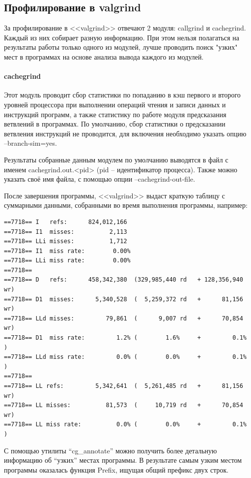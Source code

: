 \documentclass[12pt]{article}
\begin{document}
\subsection*{Профилирование в valgrind}

За профилирование в <<valgrind>> отвечают 2 модуля: callgrind и cachegrind. Каждый из них собирает разную информацию. При этом нельзя полагаться на результаты работы только одного из модулей, лучше проводить поиск "узких" мест в программах на основе анализа вывода каждого из модулей.

\paragraph*{cachegrind}

Этот модуль проводит сбор статистики по попаданию в кэш первого и второго уровней процессора при выполнении операций чтения и записи данных и инструкций программ, а также статистику по работе модуля предсказания ветвлений в программах. По умолчанию, сбор статистики о предсказании ветвления инструкций не проводится, для включения необходимо указать опцию --branch-sim=yes.

Результаты собранные данным модулем по умолчанию выводятся в файл с именем cachegrind.out.<pid> (pid -- идентификатор процесса). Также можно указать своё имя файла, с помощью опции --cachegrind-out-file.

После завершения программы, <<valgrind>> выдаст краткую таблицу с суммарными данными, собранными во время выполнения программы, например:

{\scriptsize 
\begin{lstlisting}
==7718== I   refs:      824,012,166
==7718== I1  misses:          2,113
==7718== LLi misses:          1,712
==7718== I1  miss rate:        0.00%
==7718== LLi miss rate:        0.00%
==7718==
==7718== D   refs:      458,342,380  (329,985,440 rd   + 128,356,940 wr)
==7718== D1  misses:      5,340,528  (  5,259,372 rd   +      81,156 wr)
==7718== LLd misses:         79,861  (      9,007 rd   +      70,854 wr)
==7718== D1  miss rate:         1.2% (        1.6%     +         0.1%  )
==7718== LLd miss rate:         0.0% (        0.0%     +         0.1%  )
==7718==
==7718== LL refs:         5,342,641  (  5,261,485 rd   +      81,156 wr)
==7718== LL misses:          81,573  (     10,719 rd   +      70,854 wr)
==7718== LL miss rate:          0.0% (        0.0%     +         0.1%  )
\end{lstlisting}}

С помощью утилиты ``cg\_annotate'' можно получить более детальную информацию об ``узких'' местах программы.
В результате самым узким местом программы оказалась функция Prefix, ищущая общий префикс двух строк.
\end{document}
